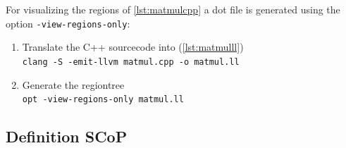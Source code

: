For visualizing the regions of \autoref{lst:matmulcpp} a dot file is generated using the option \texttt{-view-regions-only}:
\begin{enumerate}
    \item Translate the C++ sourcecode into \llvmir (\autoref{lst:matmulll})\\
        \texttt{clang -S -emit-llvm matmul.cpp -o matmul.ll}
    \item Generate the regiontree\\
        \texttt{opt -view-regions-only matmul.ll}
\end{enumerate}
\subsection{Definition SCoP}\label{subsec:definitionScop}

